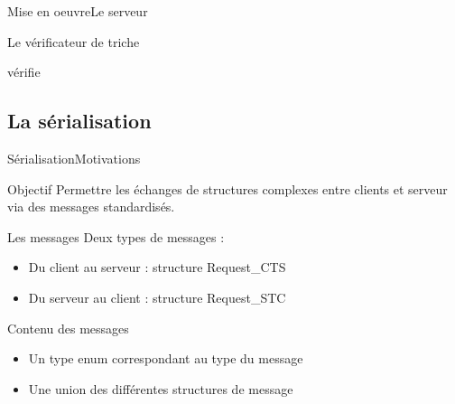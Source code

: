 \documentclass[french]{beamer}
\begin{document}
	\begin{frame}{Mise en oeuvre}{Le serveur}
		\begin{block}{Le vérificateur de triche}
			\item vérifie 
		\end{block}
	\end{frame}
























	\subsection{La sérialisation}

		\begin{frame}{Sérialisation}{Motivations}
	        \begin{block}{Objectif}
	            Permettre les échanges de structures complexes entre clients et serveur via des messages standardisés.
	        \end{block}

	        \begin{block}{Les messages}
	            Deux types de messages :
	            \begin{itemize}
	                \item Du client au serveur : structure Request\_CTS
	                \item Du serveur au client : structure Request\_STC
	            \end{itemize}
	        \end{block}

	        \begin{block}{Contenu des messages}
	            \begin{itemize}
	                \item Un type enum correspondant au type du message
	                \item Une union des différentes structures de message
	            \end{itemize}
	        \end{block}

	    \end{frame}
\end{document}
